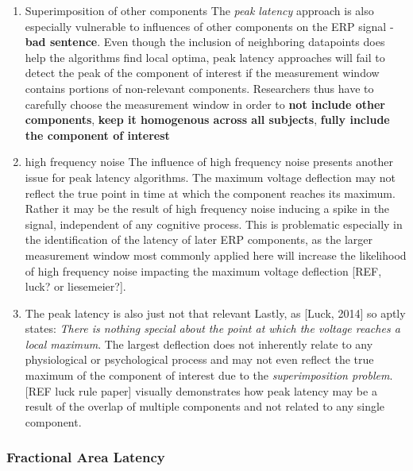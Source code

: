 \documentclass[
  man,floatsintext]{apa7}
\begin{document}
\begin{enumerate}
\def\labelenumi{\arabic{enumi}.}
\setcounter{enumi}{1}
\item
  Superimposition of other components
  The \emph{peak latency} approach is also especially vulnerable to influences of other components on the ERP signal - \textbf{bad sentence}. Even though the inclusion of neighboring datapoints does help the algorithms find local optima, peak latency approaches will fail to detect the peak of the component of interest if the measurement window contains portions of non-relevant components. Researchers thus have to carefully choose the measurement window in order to \textbf{not include other components}, \textbf{keep it homogenous across all subjects}, \textbf{fully include the component of interest}
\item
  high frequency noise
  The influence of high frequency noise presents another issue for peak latency algorithms. The maximum voltage deflection may not reflect the true point in time at which the component reaches its maximum. Rather it may be the result of high frequency noise inducing a spike in the signal, independent of any cognitive process. This is problematic especially in the identification of the latency of later ERP components, as the larger measurement window most commonly applied here will increase the likelihood of high frequency noise impacting the maximum voltage deflection {[}REF, luck? or liesemeier?{]}.
\item
  The peak latency is also just not that relevant
  Lastly, as {[}Luck, 2014{]} so aptly states: \emph{There is nothing special about the point at which the voltage reaches a local maximum}. The largest deflection does not inherently relate to any physiological or psychological process and may not even reflect the true maximum of the component of interest due to the \emph{superimposition problem}. {[}REF luck rule paper{]} visually demonstrates how peak latency may be a result of the overlap of multiple components and not related to any single component.
\end{enumerate}

\hypertarget{fractional-area-latency}{%
\subsubsection{Fractional Area Latency}\label{fractional-area-latency}}
\end{document}
